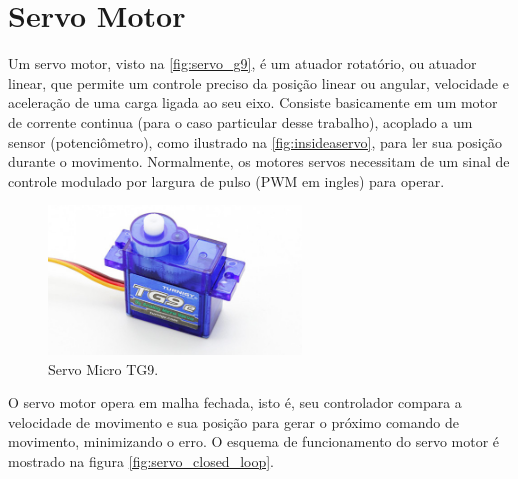 \section{Servo Motor}
\label{sec:servomotor}

Um servo motor, visto na \autoref{fig:servo_g9}, é um atuador rotatório, ou atuador linear, que permite um controle preciso da posição linear ou angular, velocidade e aceleração de uma carga ligada ao seu eixo. Consiste basicamente em um motor de corrente continua (para o caso particular desse trabalho), acoplado a um sensor (potenciômetro), como ilustrado na \autoref{fig:insideaservo}, para ler sua posição durante o movimento. Normalmente, os motores servos necessitam de um sinal de controle modulado por largura de pulso (PWM em ingles) para operar.  \par

\begin{figure}[h]
	\centering
	\includegraphics[width=0.6\textwidth]{figuras/servo_g9.jpg}
	\caption{Servo Micro TG9.}
	\label{fig:servo_g9}
\end{figure}

O servo motor opera em malha fechada, isto é, seu controlador compara a velocidade de movimento e sua posição para gerar o próximo comando de movimento, minimizando o erro.  O esquema de funcionamento do servo motor é mostrado na figura \autoref{fig:servo_closed_loop}. 

